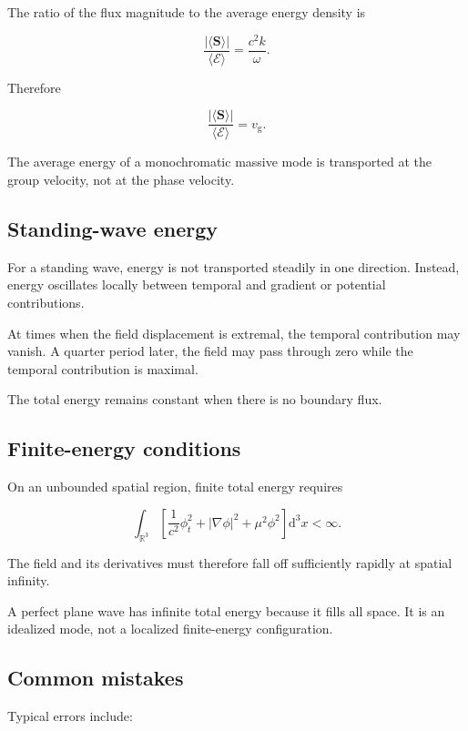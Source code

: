 The ratio of the flux magnitude to the average energy density is

\[
\frac{|\langle\mathbf{S}\rangle|}
{\langle\mathcal{E}\rangle}
=
\frac{c^{2}k}{\omega}.
\]

Therefore

\[
\boxed{
\frac{|\langle\mathbf{S}\rangle|}
{\langle\mathcal{E}\rangle}
=
v_{\mathrm{g}}
}.
\]

The average energy of a monochromatic massive mode is transported at the group velocity, not at the phase velocity.

\subsection{Standing-wave energy}

For a standing wave, energy is not transported steadily in one direction. Instead, energy oscillates locally between temporal and gradient or potential contributions.

At times when the field displacement is extremal, the temporal contribution may vanish. A quarter period later, the field may pass through zero while the temporal contribution is maximal.

The total energy remains constant when there is no boundary flux.

\subsection{Finite-energy conditions}

On an unbounded spatial region, finite total energy requires

\[
\int_{\mathbb{R}^{3}}
\left[
\frac{1}{c^{2}}\phi_{t}^{2}
+
|\nabla\phi|^{2}
+
\mu^{2}\phi^{2}
\right]
\mathrm{d}^{3}x
<\infty.
\]

The field and its derivatives must therefore fall off sufficiently rapidly at spatial infinity.

A perfect plane wave has infinite total energy because it fills all space. It is an idealized mode, not a localized finite-energy configuration.

\subsection{Common mistakes}

Typical errors include:

